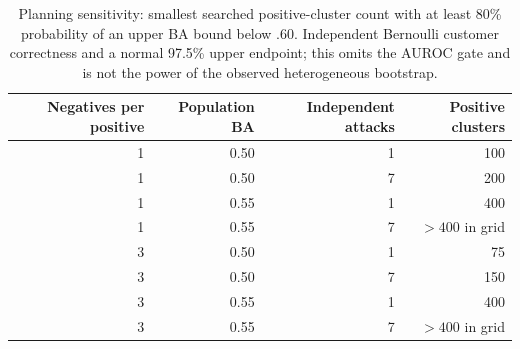 \begin{table}[ht]\centering\small
\caption{Planning sensitivity: smallest searched positive-cluster count with at least 80\% probability of an upper BA bound below .60. Independent Bernoulli customer correctness and a normal 97.5\% upper endpoint; this omits the AUROC gate and is not the power of the observed heterogeneous bootstrap.}\label{tab:r7-power}
\begin{tabular}{@{}rrrr@{}}\toprule
Negatives per positive & Population BA & Independent attacks & Positive clusters\\\midrule
1 & 0.50 & 1 & 100\\
1 & 0.50 & 7 & 200\\
1 & 0.55 & 1 & 400\\
1 & 0.55 & 7 & $>400$ in grid\\
3 & 0.50 & 1 & 75\\
3 & 0.50 & 7 & 150\\
3 & 0.55 & 1 & 400\\
3 & 0.55 & 7 & $>400$ in grid\\
\bottomrule\end{tabular}\end{table}
